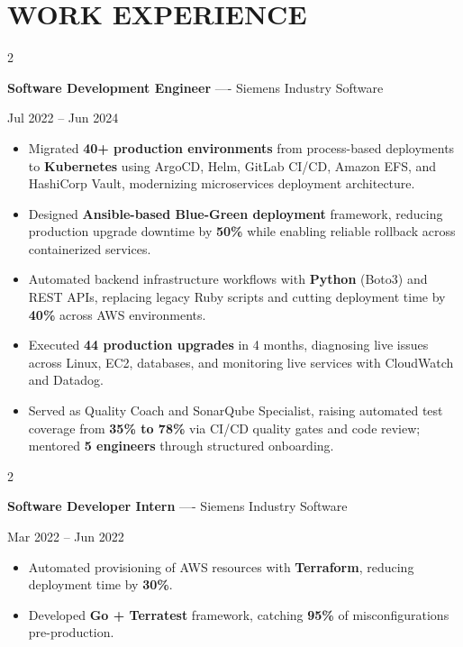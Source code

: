 \documentclass[10pt, letterpaper]{article}
\newenvironment{highlights}{
    \begin{itemize}[
        topsep=0.10 cm,
        parsep=0.06 cm,
        partopsep=0pt,
        itemsep=0.06 cm,
        leftmargin=12pt
    ]
}{
    \end{itemize}
}
\newenvironment{twocolentry}[2][]{
    \onecolentry
    \def\secondColumn{#2}
    \setcolumnwidth{\fill, 4.5 cm}
    \begin{paracol}{2}
}{
    \switchcolumn \raggedleft \secondColumn
    \end{paracol}
    \endonecolentry
}
\begin{document}
\section{WORK EXPERIENCE}
\begin{twocolentry}{Jul 2022 -- Jun 2024}
\textbf{Software Development Engineer} ---- Siemens Industry Software
\end{twocolentry}
\begin{highlights}
  \item Migrated \textbf{40+ production environments} from process-based deployments to \textbf{Kubernetes} using ArgoCD, Helm, GitLab CI/CD, Amazon EFS, and HashiCorp Vault, modernizing microservices deployment architecture.
  \item Designed \textbf{Ansible-based Blue-Green deployment} framework, reducing production upgrade downtime by \textbf{50\%} while enabling reliable rollback across containerized services.
  \item Automated backend infrastructure workflows with \textbf{Python} (Boto3) and REST APIs, replacing legacy Ruby scripts and cutting deployment time by \textbf{40\%} across AWS environments.
  \item Executed \textbf{44 production upgrades} in 4 months, diagnosing live issues across Linux, EC2, databases, and monitoring live services with CloudWatch and Datadog.
  \item Served as Quality Coach and SonarQube Specialist, raising automated test coverage from \textbf{35\% to 78\%} via CI/CD quality gates and code review; mentored \textbf{5 engineers} through structured onboarding.
\end{highlights}

\vspace{0.15 cm}

\begin{twocolentry}{Mar 2022 -- Jun 2022}
\textbf{Software Developer Intern} ---- Siemens Industry Software
\end{twocolentry}
\begin{highlights}
  \item Automated provisioning of AWS resources with \textbf{Terraform}, reducing deployment time by \textbf{30\%}.
  \item Developed \textbf{Go + Terratest} framework, catching \textbf{95\%} of misconfigurations pre-production.
\end{highlights}

\vspace{0.15 cm}
\end{document}
